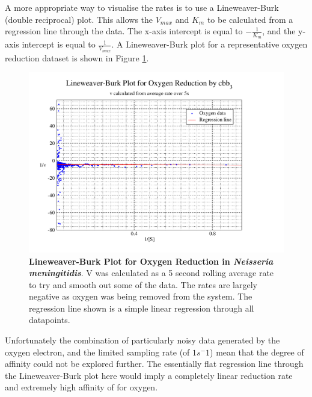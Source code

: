 A more appropriate way to visualise the rates is to use a Lineweaver-Burk (double reciprocal) plot. This allows the $V_{max}$ and $K_m$ to be calculated from a regression line through the data. The x-axis intercept is equal to $-\frac{1}{K_m}$, and the y-axis intercept is equal to $\frac{1}{V_{max}}$. A Lineweaver-Burk plot for a representative oxygen reduction dataset is shown in Figure \ref{fig:o2lb}.
\begin{figure}[ht]
 \centering
 \includegraphics[width=14cm, trim=1cm 1cm 4cm 0.5cm, clip=true]{./appendix/data/lbplot.pdf}
 \caption[{Lineweaver-Burk Plot for Oxygen Reduction in \textit{Neisseria meningitidis}.}]{{\bf Lineweaver-Burk Plot for Oxygen Reduction in \textit{Neisseria meningitidis}}. V was calculated as a 5 second rolling average rate to try and smooth out some of the data. The rates are largely negative as oxygen was being removed from the system. The regression line shown is a simple linear regression through all datapoints.
 \label{fig:o2lb}}
\end{figure}

Unfortunately the combination of particularly noisy data generated by the oxygen electron, and the limited sampling rate (of $1 s^-1$) mean that the degree of affinity could not be explored further. The essentially flat regression line through the Lineweaver-Burk plot here would imply a completely linear reduction rate and extremely high affinity of \cbbthree{} for oxygen.


